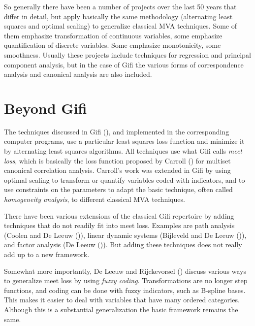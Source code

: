 \documentclass[
  12pt,
  letterpaper,
]{scrbook}
\begin{document}
So generally there have been a number of projects over the last 50 years
that differ in detail, but apply basically the same methodology
(alternating least squares and optimal scaling) to generalize classical
MVA techniques. Some of them emphasize transformation of continuous
variables, some emphasize quantification of discrete variables. Some
emphasize monotonicity, some smoothness. Usually these projects include
techniques for regression and principal component analysis, but in the
case of Gifi the various forms of correspondence analysis and canonical
analysis are also included.

\section{Beyond Gifi}\label{beyond-gifi}

The techniques discussed in Gifi (), and
implemented in the corresponding computer programs, use a particular
least squares loss function and minimize it by alternating least squares
algorithms. All techniques use what Gifi calls \emph{meet loss}, which
is basically the loss function proposed by Carroll
() for multiset canonical correlation
analysis. Carroll's work was extended in Gifi by using optimal scaling
to transform or quantify variables coded with indicators, and to use
constraints on the parameters to adapt the basic technique, often called
\emph{homogeneity analysis}, to different classical MVA techniques.

There have been various extensions of the classical Gifi repertoire by
adding techniques that do not readily fit into meet loss. Examples are
path analysis (Coolen and De Leeuw
()), linear dynamic systems
(Bijleveld and De Leeuw ()),
and factor analysis (De Leeuw ()). But
adding these techniques does not really add up to a new framework.

Somewhat more importantly, De Leeuw and Rijckevorsel
() discuss various ways
to generalize meet loss by using \emph{fuzzy coding}. Transformations
are no longer step functions, and coding can be done with fuzzy
indicators, such as B-spline bases. This makes it easier to deal with
variables that have many ordered categories. Although this is a
substantial generalization the basic framework remains the same.
\end{document}
